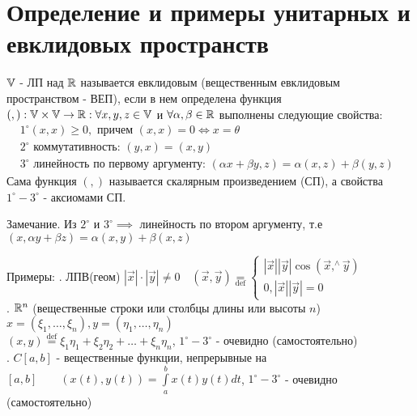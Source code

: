 \documentclass[../main.tex]{subfiles}
\begin{document}

\section{Определение и примеры унитарных и евклидовых пространств}
\begin{definition}
    $\mathbb{V}$ - ЛП над $\mathbb{R}$ называется евклидовым (вещественным евклидовым пространством - ВЕП), если в нем определена функция $(,): \mathbb{V} \times \mathbb{V}\to \mathbb{R}: \forall x,y ,z \in \mathbb{V}$ и $\forall \alpha,\beta \in \mathbb{R}$ выполнены следующие свойства:\\ 
    $\begin{aligned}
        &1^{\circ} (x,x)\geqslant 0, \text{ причем } (x,x) =0 \Leftrightarrow x=\theta\\ 
        &2^{\circ} \text{ коммутативность: } (y,x) = (x,y)\\ 
        &3^{\circ} \text{ линейность по первому аргументу: } (\alpha x + \beta y, z) = \alpha (x,z) + \beta (y,z)
    \end{aligned}$\\ 
    Сама функция $(,)$ называется скалярным произведением (СП), а свойства $1^{\circ}-3^{\circ}$ - аксиомами СП. 
\end{definition}
Замечание. Из $2^{\circ}$ и $3^{\circ}\implies$ линейность по втором аргументу, т.е $(x,\alpha y +\beta z ) = \alpha(x,y) + \beta(x,z)$

Примеры:
. ЛПВ(геом) $|\vec{x}| \cdot |\vec{y}|\neq  0 \quad (\vec{x},\vec{y}) \underset{\text{def}}{=} \begin{cases}
    |\vec{x}||\vec{y}| \cos{( \vec{x}{,}^{\wedge}\vec{y})} \\ 
    0, |\vec{x}||\vec{y}| = 0 
\end{cases}$ \\ 
. $\mathbb{R}^{n}$ (вещественные строки или столбцы длины или высоты $n$) \qquad $x=(\xi_{1}, \dots ,\xi_{n}), y = (\eta_{1}, \dots ,\eta_{n})$\\
$(x,y)\overset{\text{def}}{=} \xi_{1}\eta_{1} + \xi_{2}\eta_{2} + \dots + \xi_{n}\eta_{n}$, $1^{\circ}-3^{\circ}$ - очевидно (самостоятельно)\\ 
. $C[a,b]$ - вещественные функции, непрерывные на $[a,b]\qquad (x(t),y(t))= \int\limits_{a   }^{b    } x(t)y(t)dt$, $1^{\circ}- 3^{\circ}$ - очевидно (самостоятельно)\\
\end{document}

